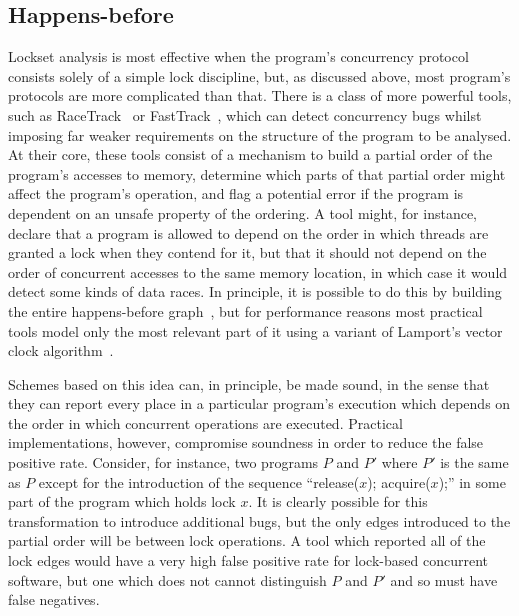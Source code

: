 \subsection{Happens-before}

Lockset analysis is most effective when the program's concurrency
protocol consists solely of a simple lock discipline, but, as
discussed above, most program's protocols are more complicated than
that.  There is a class of more powerful tools, such as
RaceTrack~\cite{Yu2005} or FastTrack~\cite{Flanagan2009}, which can
detect concurrency bugs whilst imposing far weaker requirements on the
structure of the program to be analysed.  At their core, these tools
consist of a mechanism to build a partial order of the program's
accesses to memory, determine which parts of that partial order might
affect the program's operation, and flag a potential error if the
program is dependent on an unsafe property of the ordering.  A tool
might, for instance, declare that a program is allowed to depend on
the order in which threads are granted a lock when they contend for
it, but that it should not depend on the order of concurrent accesses
to the same memory location, in which case it would detect some kinds
of data races.  In principle, it is possible to do this by building
the entire happens-before graph~\cite{Netzer1991}, but for performance
reasons most practical tools model only the most relevant part of it
using a variant of Lamport's vector clock
algorithm~\cite{Lamport1978}.

Schemes based on this idea can, in principle, be made sound, in the
sense that they can report every place in a particular program's
execution which depends on the order in which concurrent operations
are executed.  Practical implementations, however, compromise
soundness in order to reduce the false positive rate.  Consider, for
instance, two programs $P$ and $P'$ where $P'$ is the same as $P$
except for the introduction of the sequence ``release($x$);
acquire($x$);'' in some part of the program which holds lock $x$.  It
is clearly possible for this transformation to introduce additional
bugs, but the only edges introduced to the partial order will be
between lock operations.  A tool which reported all of the lock edges
would have a very high false positive rate for lock-based concurrent
software, but one which does not cannot distinguish $P$ and $P'$ and
so must have false negatives.  

